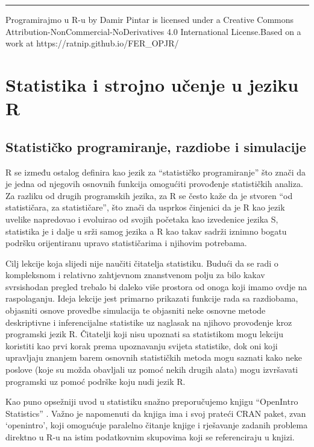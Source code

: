 \documentclass[]{book}
\theoremstyle{definition}
\theoremstyle{definition}
\theoremstyle{definition}
\theoremstyle{remark}
\begin{document}
\begin{center}\rule{0.5\linewidth}{\linethickness}\end{center}

{Programirajmo u R-u} by Damir Pintar is licensed under a Creative
Commons Attribution-NonCommercial-NoDerivatives 4.0 International
License.Based on a work at https://ratnip.github.io/FER\_OPJR/

\part{Statistika i strojno učenje u jeziku
R}\label{part-statistika-i-strojno-ucenje-u-jeziku-r}

\chapter{Statističko programiranje, razdiobe i
simulacije}\label{razdiobe}

R se između ostalog definira kao jezik za ``statističko programiranje''
što znači da je jedna od njegovih osnovnih funkcija omogućiti provođenje
statističkih analiza. Za razliku od drugih programskih jezika, za R se
često kaže da je stvoren ``od statističara, za statističare'', što znači
da usprkos činjenici da je R kao jezik uvelike napredovao i evoluirao od
svojih početaka kao izvedenice jezika S, statistika je i dalje u srži
samog jezika a R kao takav sadrži iznimno bogatu podršku orijentiranu
upravo statističarima i njihovim potrebama.

Cilj lekcije koja slijedi nije naučiti čitatelja statistiku. Budući da
se radi o kompleksnom i relativno zahtjevnom znanstvenom polju za bilo
kakav svrsishodan pregled trebalo bi daleko više prostora od onoga koji
imamo ovdje na raspolaganju. Ideja lekcije jest primarno prikazati
funkcije rada sa razdiobama, objasniti osnove provedbe simulacija te
objasniti neke osnovne metode deskriptivne i inferencijalne statistike
uz naglasak na njihovo provođenje kroz programski jezik R. Čitatelji
koji nisu upoznati sa statistikom mogu lekciju koristiti kao prvi korak
prema upoznavanju svijeta statistike, dok oni koji upravljaju znanjem
barem osnovnih statističkih metoda mogu saznati kako neke poslove (koje
su možda obavljali uz pomoć nekih drugih alata) mogu izvršavati
programski uz pomoć podrške koju nudi jezik R.

Kao puno opsežniji uvod u statistiku snažno preporučujemo knjigu
``OpenIntro Statistics'' \citep{diez2015openintro}. Važno je napomenuti
da knjiga ima i svoj prateći CRAN paket, zvan `openintro', koji
omogućuje paralelno čitanje knjige i rješavanje zadanih problema
direktno u R-u na istim podatkovnim skupovima koji se referenciraju u
knjizi.
\end{document}

